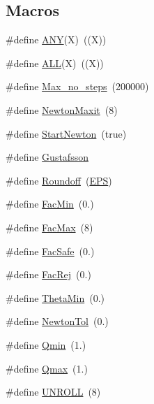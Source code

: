 \subsection*{Macros}
\begin{DoxyCompactItemize}
\item 
\#define \hyperlink{radau2a_8cu_a1fb079c51babe820cd76885d3c519446}{A\+NY}(X)~((X))
\item 
\#define \hyperlink{radau2a_8cu_ada568356af1dada57942e4b6e5d271b0}{A\+LL}(X)~((X))
\item 
\#define \hyperlink{radau2a_8cu_a4f5652e996f678da1b1b93c8aa4a7961}{Max\+\_\+no\+\_\+steps}~(200000)
\item 
\#define \hyperlink{radau2a_8cu_ab408861ee5149b85ac129cb8a3875743}{Newton\+Maxit}~(8)
\item 
\#define \hyperlink{radau2a_8cu_aa9c48bc3c2002ed4e6792dd7f526d783}{Start\+Newton}~(true)
\item 
\#define \hyperlink{radau2a_8cu_a619cdc11d911799dd674458eb84dc349}{Gustafsson}
\item 
\#define \hyperlink{radau2a_8cu_a0628e9521e9961c49b173765f9d815d3}{Roundoff}~(\hyperlink{solver__options_8h_a6ebf6899d6c1c8b7b9d09be872c05aae}{E\+PS})
\item 
\#define \hyperlink{radau2a_8cu_a2709085ffea146cba50846d860f7d945}{Fac\+Min}~(0.)
\item 
\#define \hyperlink{radau2a_8cu_a3ae724566d10e7ae2a48e1d340d6937b}{Fac\+Max}~(8)
\item 
\#define \hyperlink{radau2a_8cu_a29559e0d6fcf09d76688dbc471b01219}{Fac\+Safe}~(0.)
\item 
\#define \hyperlink{radau2a_8cu_afb5b5659c29086c78a546a078c08238f}{Fac\+Rej}~(0.)
\item 
\#define \hyperlink{radau2a_8cu_a1dea03e748069283de9d62ca81b64e75}{Theta\+Min}~(0.)
\item 
\#define \hyperlink{radau2a_8cu_a5ea658585341bf26e79bbf1ed3497e6f}{Newton\+Tol}~(0.)
\item 
\#define \hyperlink{radau2a_8cu_ac523cd36edc6fc54a93dfdb10a772bc0}{Qmin}~(1.)
\item 
\#define \hyperlink{radau2a_8cu_afcfd11ffcebe8a32d20dcacebefa7e6f}{Qmax}~(1.)
\item 
\#define \hyperlink{radau2a_8cu_a870020ccb79b9bf241010e975e029bde}{U\+N\+R\+O\+LL}~(8)
\end{DoxyCompactItemize}

